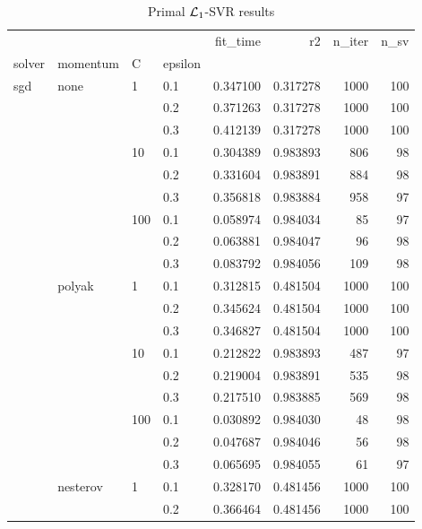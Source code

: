 \begin{table}[H]
\centering
\caption{Primal $\protect \mathcal{L}_1$-SVR results}
\label{primal_l1_svr_cv_results}
\begin{tabular}{llllrrrr}
\toprule
          &   &     &     &  fit\_time &        r2 &  n\_iter &  n\_sv \\
solver & momentum & C & epsilon &           &           &         &       \\
\midrule
sgd & none & 1   & 0.1 &  0.347100 &  0.317278 &    1000 &   100 \\
          &   &     & 0.2 &  0.371263 &  0.317278 &    1000 &   100 \\
          &   &     & 0.3 &  0.412139 &  0.317278 &    1000 &   100 \\
          &   & 10  & 0.1 &  0.304389 &  0.983893 &     806 &    98 \\
          &   &     & 0.2 &  0.331604 &  0.983891 &     884 &    98 \\
          &   &     & 0.3 &  0.356818 &  0.983884 &     958 &    97 \\
          &   & 100 & 0.1 &  0.058974 &  0.984034 &      85 &    97 \\
          &   &     & 0.2 &  0.063881 &  0.984047 &      96 &    98 \\
          &   &     & 0.3 &  0.083792 &  0.984056 &     109 &    98 \\
          & polyak & 1   & 0.1 &  0.312815 &  0.481504 &    1000 &   100 \\
          &   &     & 0.2 &  0.345624 &  0.481504 &    1000 &   100 \\
          &   &     & 0.3 &  0.346827 &  0.481504 &    1000 &   100 \\
          &   & 10  & 0.1 &  0.212822 &  0.983893 &     487 &    97 \\
          &   &     & 0.2 &  0.219004 &  0.983891 &     535 &    98 \\
          &   &     & 0.3 &  0.217510 &  0.983885 &     569 &    98 \\
          &   & 100 & 0.1 &  0.030892 &  0.984030 &      48 &    98 \\
          &   &     & 0.2 &  0.047687 &  0.984046 &      56 &    98 \\
          &   &     & 0.3 &  0.065695 &  0.984055 &      61 &    97 \\
          & nesterov & 1   & 0.1 &  0.328170 &  0.481456 &    1000 &   100 \\
          &   &     & 0.2 &  0.366464 &  0.481456 &    1000 &   100 \\

\end{tabular}
\end{table}
